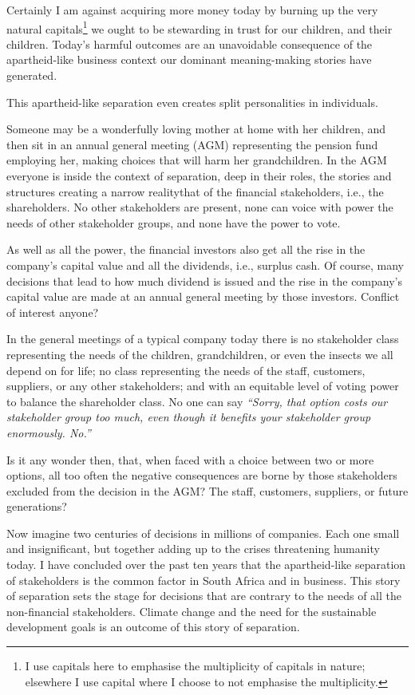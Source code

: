 Certainly I am against acquiring more money today by burning up the very natural capitals\footnote{I use capitals here to emphasise the multiplicity of capitals in nature; elsewhere I use capital where I choose to not emphasise the multiplicity.} we ought to be stewarding in trust for our children, and their children. Today’s harmful outcomes are an unavoidable consequence of the apartheid-like business context our dominant meaning\hyp{}making stories have generated.


This apartheid-like separation even creates split personalities in individuals. 


Someone may be a wonderfully loving mother at home with her children, and then sit in an annual general meeting (AGM) representing the pension fund employing her, making choices that will harm her grandchildren. In the AGM everyone is inside the context of separation, deep in their roles, the stories and structures creating a narrow reality\textemdash that of the financial stakeholders, i.e., the shareholders. No other stakeholders are present, none can voice with power the needs of other stakeholder groups, and none have the power to vote.


As well as all the power, the financial investors also get all the rise in the company’s capital value and all the dividends, i.e., surplus cash. Of course, many decisions that lead to how much dividend is issued and the rise in the company’s capital value are made at an annual general meeting by those investors. Conflict of interest anyone?


In the general meetings of a typical company today there is no stakeholder class representing the needs of the children, grandchildren, or even the insects we all depend on for life; no class representing the needs of the staff, customers, suppliers, or any other stakeholders; and with an equitable level of voting power to balance the shareholder class. No one can say \emph{“Sorry, that option costs our stakeholder group too much, even though it benefits your stakeholder group enormously. No.”}


Is it any wonder then, that, when faced with a choice between two or more options, all too often the negative consequences are borne by those stakeholders excluded from the decision in the AGM? The staff, customers, suppliers, or future generations? 


Now imagine two centuries of decisions in millions of companies. Each one small and insignificant, but together adding up to the crises threatening humanity today. I have concluded over the past ten years that the apartheid-like separation of stakeholders is the common factor in South Africa and in business. This story of separation sets the stage for decisions that are contrary to the needs of all the non-financial stakeholders. Climate change and the need for the sustainable development goals is an outcome of this story of separation.


